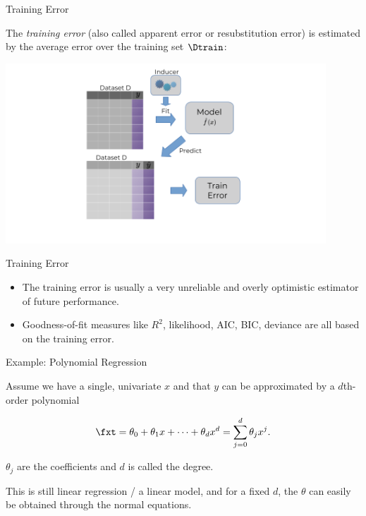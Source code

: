 \begin{frame}{Training Error}

The \emph{training error} (also called apparent error or resubstitution
error) is estimated by the average error over the training set
\(\Dtrain\):

\includegraphics[width=12cm,page=4]{plots/train_error.png}

\end{frame}

\begin{frame}{Training Error}

\begin{itemize}
\item
  The training error is usually a very unreliable and overly optimistic
  estimator of future performance.
\item
  Goodness-of-fit measures like \(R^2\), likelihood, AIC, BIC, deviance
  are all based on the training error.
\end{itemize}

\end{frame}

\begin{frame}{Example: Polynomial Regression}

Assume we have a single, univariate \(x\) and that \(y\) can be
approximated by a \(d\)th-order polynomial

\[ \fxt = \theta_0 + \theta_1 x + \cdots + \theta_d x^d = \sum_{j = 0}^{d} \theta_j x^j\text{.} \]

\(\theta_j\) are the coefficients and \(d\) is called the degree.

This is still linear regression / a linear model, and for a fixed \(d\),
the \(\theta\) can easily be obtained through the normal equations.

\end{frame}

